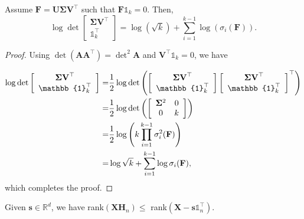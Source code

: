 \documentclass[journal]{IEEEtran}
\begin{document}
%
%
%
%
\begin{Lemma2}
	Assume $\mathbf{F}=\mathbf{U\Sigma V}^\top$ such that $\mathbf{F}\mathbb{1}_k = 0$. Then,
	\[
	\log \det 
	\left[ \begin{array}{c}
	\mathbf{\Sigma V}^\top \\ \mathbb{1}_k^\top \end{array}
	\right] = \log(\sqrt{k}) +  \sum_{i=1}^{k-1} \log(\sigma_i(\mathbf{F})).
	\]
\end{Lemma2}
\begin{proof}
	Using $\det (\mathbf{A}\mathbf{A}^\top)= \det^2 \mathbf{A}$ and $\mathbf{V}^\top\mathbb{1}_k = 0$, we have
	
	\[
	\begin{aligned}
	\log \det 
	\left[ \begin{array}{c}
	\mathbf{\Sigma V}^\top \\ \mathbb{1}_k^\top \end{array}
	\right]
	=& 
	\frac{1}{2} \log \det \left(
	\left[ \begin{array}{c}
	\mathbf{\Sigma V}^\top \\ \mathbb{1}_k^\top \end{array}
	\right]
	\left[ \begin{array}{c}
	\mathbf{\Sigma V}^\top \\ \mathbb{1}_k^\top \end{array}
	\right]^\top
	\right) \\
	=&
	\frac{1}{2} \log \det \left(
	\left[ \begin{array}{c c}
	\mathbf{\Sigma}^2 & 0 \\ 0 & k \end{array}
	\right]
	\right) \\
	=&
	\frac{1}{2}\log \left( k\prod_{i=1}^{k-1}\sigma_i^2(\mathbf{F}) \right) \\
	=& \log\sqrt{k} + \sum_{i=1}^{k-1}\log \sigma_i(\mathbf{F}),
	\end{aligned}
	\]
	which completes the proof.
\end{proof}
%
\begin{Lemma2}\label{lem:rankXH}
	Given $\mathbf{s}\in\mathbb{R}^d$, we have rank$(\mathbf{XH}_n) \leq$ rank$(\mathbf{X}-\mathbf{s}\mathbb{1}_n^\top)$.
\end{Lemma2}
\end{document}
